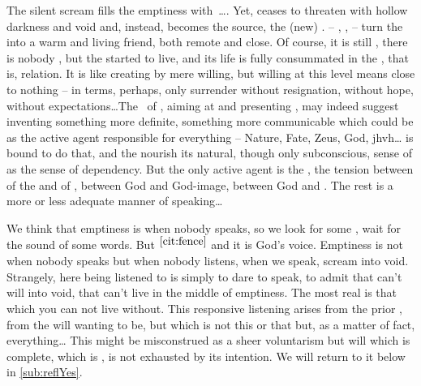 \label{pre:goodfromevil}
%
The silent scream  fills the emptiness with~\ldots {}.
Yet,  ceases to threaten with hollow darkness and void and,
instead, becomes the source, the (new) .  
-- , ,  -- turn the  into a warm and living friend, both remote and close.  Of course,
it is still , there is nobody , but the
 started to live, and its life is fully consummated in the
, that is,  relation. It is like creating by mere
willing, but willing at this level means close to nothing -- in 
terms, perhaps, only surrender without resignation,  without hope,
 without expectations\ldots  The \sch\ of \Yes, aiming at  and
presenting , may indeed suggest inventing something more definite,
something more communicable which could be  as the active agent
responsible for everything -- Nature, Fate, Zeus, God, {\sc jhvh}\ldots  {}
is bound to do that, and the  nourish its natural, though
only subconscious, sense of  as the sense of dependency.  But the
only active agent is the , the tension between  of
the  and  of , between God and God-image,
between God and . The rest is a more or less adequate manner of
speaking\ldots

We think that emptiness is when nobody speaks, so we look for some ,
wait for the sound of some words. But $^{\ref{cit:fence}}$ and it is God's voice. Emptiness is
not when nobody speaks but when nobody listens, when we speak, scream into void.
Strangely, here being listened to is simply to dare to speak, to admit that
 can't will into void, that  can't live in the middle of emptiness.
The most real is that which you can not live without.
This responsive listening arises from the prior \yes, from the will wanting
 to be, but  which is not this or that but, as a
matter of fact, everything\ldots {} { This might
  be misconstrued as a sheer voluntarism but will which is complete, which is
  , is not exhausted by its  intention. We
  will return to it below in \ref{sub:reflYes}.}


